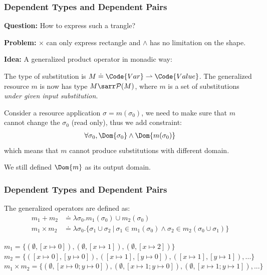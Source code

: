 \begin{frame}[fragile]
    \frametitle{Dependent Types and Dependent Pairs}

\textbf{Question:} How to express such a trangle?

\textbf{Problem:} $\times$ can only express rectangle and $\land$ has no limitation on the shape.

\textbf{Idea:} A generalized product operator in monadic way:

\begin{definition}
    The type of substitution is $M \doteq \Code{Var} \rightharpoonup \Code{Value}$.
    The generalized resource $m$ is now has type $M \sarr \mathcal{P}(M)$, where $m$ is a set of substitutions \emph{under given input substitution}.

    Consider a resource application $\sigma = m(\sigma_0)$, we need to make sure that $m$ cannot change the $\sigma_0$ (read only), thus we add constraint:
    \begin{align*}
        \forall \sigma_0, \Dom{\sigma_0} \land \Dom{m(\sigma_0)} 
    \end{align*}
    which means that $m$ cannot produce substitutions with different domain.

    We still defined $\Dom{m}$ as its output domain.
\end{definition}


\end{frame}

\begin{frame}[fragile]
    \frametitle{Dependent Types and Dependent Pairs}

\begin{definition}

    The generalized operators are defined as:
    \begin{align*}
        m_1 + m_2 &\doteq \lambda \sigma_0. m_1(\sigma_0) \cup m_2(\sigma_0) 
        \\m_1 \times m_2 &\doteq \lambda \sigma_0. \{ \sigma_1 \cup \sigma_2 ~|~ \sigma_1 \in m_1(\sigma_0) \land \sigma_2 \in m_2(\sigma_0 \cup \sigma_1)  \}
    \end{align*}
\end{definition}

\begin{example}
$m_1 = \{ (\emptyset, [x\mapsto 0]), (\emptyset, [x\mapsto 1]), (\emptyset, [x\mapsto 2]) \}$
$m_2 = \{ ([x\mapsto 0], [y\mapsto 0]), ([x\mapsto 1], [y\mapsto 0]), ([x\mapsto 1], [y\mapsto 1]), ... \}$
$m_1 \times m_2 = \{ (\emptyset, [x\mapsto 0;y\mapsto 0]), (\emptyset, [x\mapsto 1;y\mapsto 0]), (\emptyset, [x\mapsto 1;y\mapsto 1]), ... \}$
\end{example}

\end{frame}

